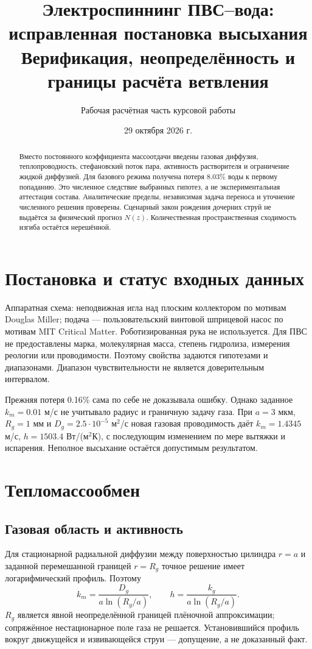 \documentclass[12pt,a4paper]{article}
\title{Электроспиннинг ПВС--вода:\\исправленная постановка высыхания\\\large Верификация, неопределённость и границы расчёта ветвления}
\author{Рабочая расчётная часть курсовой работы}\date{29 октября 2026 г.}
\begin{document}
\maketitle
\begin{abstract}
Вместо постоянного коэффициента массоотдачи введены газовая диффузия,
теплопроводность, стефановский поток пара, активность растворителя и
ограничение жидкой диффузией. Для базового режима получена потеря
8.03\% воды к первому попаданию. Это численное следствие выбранных
гипотез, а не экспериментальная аттестация состава. Аналитические пределы,
независимая задача переноса и уточнение численного решения проверены.
Сценарный закон рождения дочерних струй не выдаётся за физический прогноз
$N(z)$. Количественная пространственная сходимость изгиба остаётся нерешённой.
\end{abstract}
\section{Постановка и статус входных данных}
Аппаратная схема: неподвижная игла над плоским коллектором по мотивам
Douglas Miller; подача — пользовательский винтовой шприцевой насос по мотивам
MIT Critical Matter. Роботизированная рука не используется. Для ПВС не
предоставлены марка, молекулярная масса, степень гидролиза, измерения реологии
или проводимости. Поэтому свойства задаются гипотезами и диапазонами.
Диапазон чувствительности не является доверительным интервалом.

Прежняя потеря 0.16\% сама по себе не доказывала ошибку. Однако заданное
$k_m=0.01$ м/с не учитывало радиус и граничную задачу газа. При $a=3$ мкм,
$R_g=1$ мм и $D_g=2.5\cdot10^{-5}$ м$^2$/с новая газовая проводимость
даёт $k_m=1.4345$ м/с, $h=1503.4$ Вт/(м$^2$К), с последующим изменением по
мере вытяжки и испарения. Неполное высыхание остаётся допустимым результатом.

\section{Тепломассообмен}
\subsection{Газовая область и активность}
Для стационарной радиальной диффузии между поверхностью цилиндра $r=a$ и
заданной перемешанной границей $r=R_g$ точное решение имеет логарифмический
профиль. Поэтому
\[
 k_m=\frac{D_g}{a\ln(R_g/a)},\qquad
 h=\frac{k_g}{a\ln(R_g/a)}.
\]
$R_g$ является явной неопределённой границей плёночной аппроксимации;
сопряжённое нестационарное поле газа не решается. Установившийся профиль
вокруг движущейся и извивающейся струи — допущение, а не доказанный факт.
\end{document}
